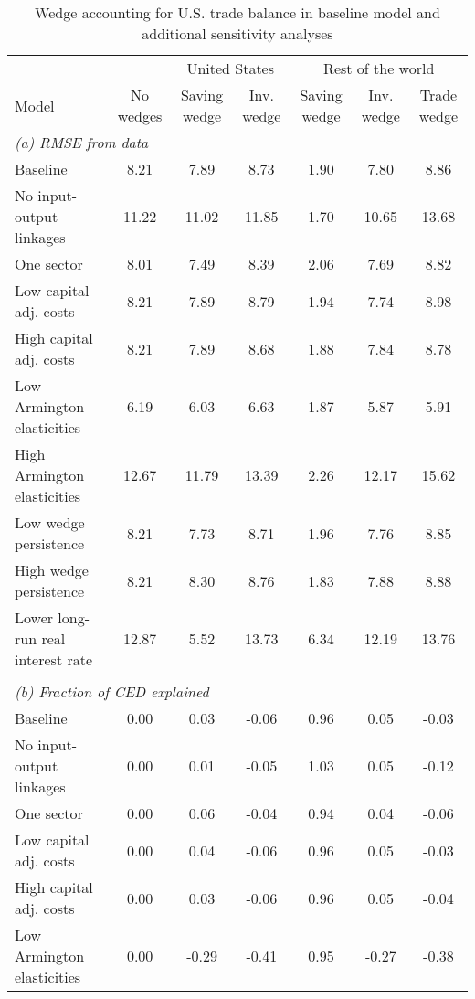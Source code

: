 \begin{table}[p]
\footnotesize
\begin{center}
\caption{Wedge accounting for U.S. trade balance in baseline model and additional sensitivity analyses}
\label{tab:tb-results-2}
\begin{threeparttable}\begin{tabular}{lcccccc}
\toprule
& & \multicolumn{2}{c}{United States} & \multicolumn{3}{c}{Rest of the world}\\
\cmidrule(rl){3-4}\cmidrule(rl){5-7}
Model & No wedges & Saving wedge & Inv. wedge & Saving wedge & Inv. wedge & Trade wedge\\
\midrule
\multicolumn{7}{l}{\textit{(a) RMSE from data}}\\
Baseline& 8.21 & 7.89 & 8.73 & 1.90 & 7.80 & 8.86\\
No input-output linkages& 11.22 & 11.02 & 11.85 & 1.70 & 10.65 & 13.68\\
One sector& 8.01 & 7.49 & 8.39 & 2.06 & 7.69 & 8.82\\
Low capital adj. costs& 8.21 & 7.89 & 8.79 & 1.94 & 7.74 & 8.98\\
High capital adj. costs& 8.21 & 7.89 & 8.68 & 1.88 & 7.84 & 8.78\\
Low Armington elasticities& 6.19 & 6.03 & 6.63 & 1.87 & 5.87 & 5.91\\
High Armington elasticities& 12.67 & 11.79 & 13.39 & 2.26 & 12.17 & 15.62\\
Low wedge persistence& 8.21 & 7.73 & 8.71 & 1.96 & 7.76 & 8.85\\
High wedge persistence& 8.21 & 8.30 & 8.76 & 1.83 & 7.88 & 8.88\\
Lower long-run real interest rate& 12.87 & 5.52 & 13.73 & 6.34 & 12.19 & 13.76\\
\\
\multicolumn{7}{l}{\textit{(b) Fraction of CED explained}}\\
Baseline& 0.00 & 0.03 & -0.06 & 0.96 & 0.05 & -0.03\\
No input-output linkages& 0.00 & 0.01 & -0.05 & 1.03 & 0.05 & -0.12\\
One sector& 0.00 & 0.06 & -0.04 & 0.94 & 0.04 & -0.06\\
Low capital adj. costs& 0.00 & 0.04 & -0.06 & 0.96 & 0.05 & -0.03\\
High capital adj. costs& 0.00 & 0.03 & -0.06 & 0.96 & 0.05 & -0.04\\
Low Armington elasticities& 0.00 & -0.29 & -0.41 & 0.95 & -0.27 & -0.38\\

\end{tabular}
\end{threeparttable}
\end{center}
\end{table}
